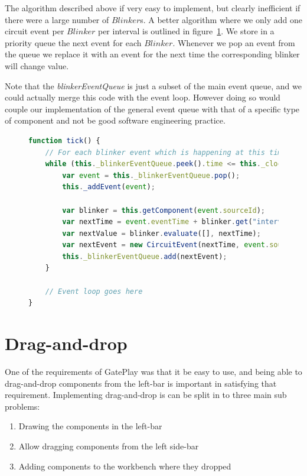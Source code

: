 The algorithm described above if very easy to implement, but clearly inefficient if there were a large number of $Blinker$s. A better algorithm where we only add one circuit event per $Blinker$ per interval is outlined in figure~\ref{fig:blinkerqueue}. We store in a priority queue the next event for each $Blinker$. Whenever we pop an event from the queue we replace it with an event for the next time the corresponding blinker will change value.

Note that the \textit{blinkerEventQueue} is just a subset of the main event queue, and we could actually merge this code with the event loop. However doing so would couple our implementation of the general event queue with that of a specific type of component and not be good software engineering practice.

\begin{figure}
\begin{lstlisting}[language=JavaScript]
function tick() {
	// For each blinker event which is happening at this time
	while (this._blinkerEventQueue.peek().time <= this._clock) {
		var event = this._blinkerEventQueue.pop();
		this._addEvent(event);
		
		var blinker = this.getComponent(event.sourceId);
		var nextTime = event.eventTime + blinker.get("interval");
		var nextValue = blinker.evaluate([], nextTime);
		var nextEvent = new CircuitEvent(nextTime, event.sourceId, event.sourcePort, nextValue);
		this._blinkerEventQueue.add(nextEvent);
	}
	
	// Event loop goes here
}
\end{lstlisting}
\caption{}
\label{fig:blinkerqueue}
\end{figure}

\section{Drag-and-drop}
One of the requirements of GatePlay was that it be easy to use, and being able to drag-and-drop components from the left-bar is important in satisfying that requirement. Implementing drag-and-drop is can be split in to three main sub problems:

\begin{enumerate}
	\item Drawing the components in the left-bar
	\item Allow dragging components from the left side-bar
	\item Adding components to the workbench where they dropped
\end{enumerate}

